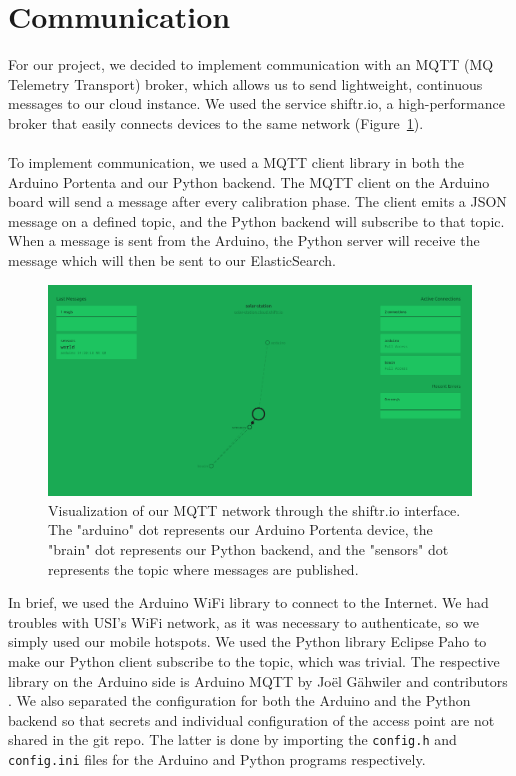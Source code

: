 \section*{Communication}

For our project, we decided to implement communication with an MQTT (MQ Telemetry Transport) broker, which allows us to send lightweight, continuous messages to our cloud instance.
We used the service shiftr.io, a high-performance broker that easily connects devices to the same network (Figure~\ref{fig:shiftrviz}). \\ \\
To implement communication, we used a MQTT client library in both the Arduino Portenta and our Python backend.
The MQTT client on the Arduino board will send a message after every calibration phase.
The client emits a JSON message on a defined topic, and the Python backend will subscribe to that topic.
When a message is sent from the Arduino, the Python server will receive the message which will then be sent to our ElasticSearch.
\begin{figure}[H]
    \centering
    \includegraphics[width=15cm]{../assets/png/shiftr-network}
    \caption{Visualization of our MQTT network through the shiftr.io interface. The "arduino" dot represents our Arduino Portenta device, the "brain" dot represents our Python backend, and the "sensors" dot represents the topic where messages are published.}
    \label{fig:shiftrviz}
\end{figure}
In brief, we used the Arduino WiFi library to connect to the Internet. We had
troubles with USI's WiFi network, as it was necessary to authenticate, so we
simply used our mobile hotspots. We used the Python library Eclipse Paho
\cite{paho} to make our Python client subscribe to the topic, which was trivial.
The respective library on the Arduino side is Arduino MQTT by Joël Gähwiler and
contributors \cite{arduinomqtt}. We also separated the configuration for both
the Arduino and the Python backend so that secrets and individual configuration
of the access point are not shared in the git repo. The latter is done by
importing the \texttt{config.h} and \texttt{config.ini} files for the Arduino
and Python programs respectively.

